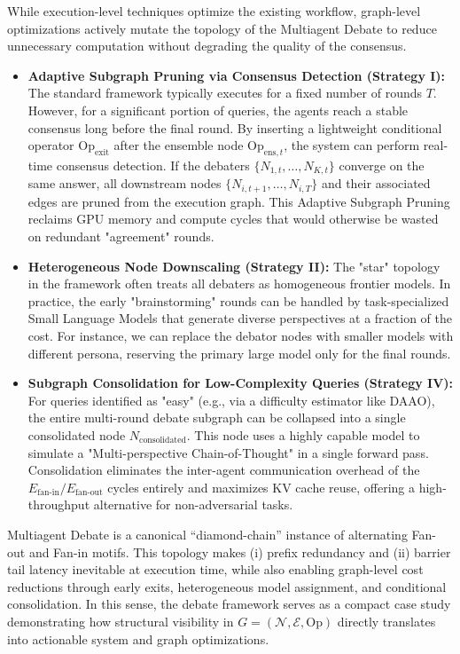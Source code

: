 While execution-level techniques optimize the existing workflow, graph-level optimizations actively mutate the topology of the Multiagent Debate to reduce unnecessary computation without degrading the quality of the consensus.

\begin{itemize}
    \item \textbf{Adaptive Subgraph Pruning via Consensus Detection (Strategy I):} The standard framework typically executes for a fixed number of rounds $T$. However, for a significant portion of queries, the agents reach a stable consensus long before the final round. By inserting a lightweight conditional operator $\text{Op}_{\text{exit}}$ after the ensemble node $\text{Op}_{\text{ens}, t}$, the system can perform real-time consensus detection. If the debaters $\{N_{1,t}, \dots, N_{K,t}\}$ converge on the same answer, all downstream nodes $\{N_{i, t+1}, \dots, N_{i, T}\}$ and their associated edges are pruned from the execution graph. This Adaptive Subgraph Pruning reclaims GPU memory and compute cycles that would otherwise be wasted on redundant "agreement" rounds.

    \item \textbf{Heterogeneous Node Downscaling (Strategy II):} The "star" topology in the framework often treats all debaters as homogeneous frontier models. In practice, the early "brainstorming" rounds can be handled by task-specialized Small Language Models that generate diverse perspectives at a fraction of the cost. For instance, we can replace the debator nodes with smaller models with different persona, reserving the primary large model only for the final rounds.

    \item \textbf{Subgraph Consolidation for Low-Complexity Queries (Strategy IV):} For queries identified as "easy" (e.g., via a difficulty estimator like DAAO), the entire multi-round debate subgraph can be collapsed into a single consolidated node $N_{\text{consolidated}}$. This node uses a highly capable model to simulate a "Multi-perspective Chain-of-Thought" in a single forward pass. Consolidation eliminates the inter-agent communication overhead of the $E_{\text{fan-in}}/E_{\text{fan-out}}$ cycles entirely and maximizes KV cache reuse, offering a high-throughput alternative for non-adversarial tasks.
\end{itemize}

Multiagent Debate is a canonical ``diamond-chain'' instance of alternating Fan-out and Fan-in motifs. This topology makes (i) prefix redundancy and (ii) barrier tail latency inevitable at execution time, while also enabling graph-level cost reductions through early exits, heterogeneous model assignment, and conditional consolidation. In this sense, the debate framework serves as a compact case study demonstrating how structural visibility in $G=(\mathcal{N},\mathcal{E},\mathrm{Op})$ directly translates into actionable system and graph optimizations.

